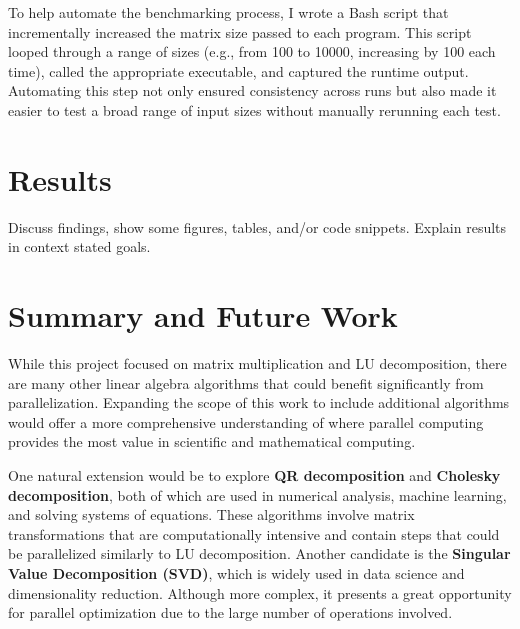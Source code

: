 \documentclass[12pt]{article}
\begin{document}
To help automate the benchmarking process, I wrote a Bash script that incrementally increased the matrix size passed to each program. This script looped
through a range of sizes (e.g., from 100 to 10000, increasing by 100 each time), called the appropriate executable, and captured the runtime output.
Automating this step not only ensured consistency across runs but also made it easier to test a broad range of input sizes without manually rerunning
each test.


\section{Results}
Discuss findings, show some figures, tables, and/or code snippets.
Explain results in context stated goals.


\section{Summary and Future Work}
While this project focused on matrix multiplication and LU decomposition, there are many other linear algebra algorithms that could benefit significantly
from parallelization. Expanding the scope of this work to include additional algorithms would offer a more comprehensive understanding of where parallel
computing provides the most value in scientific and mathematical computing.

\vspace{1em}


One natural extension would be to explore \textbf{QR decomposition} and \textbf{Cholesky decomposition}, both of which are used in numerical analysis,
machine learning, and solving systems of equations. These algorithms involve matrix transformations that are computationally intensive and contain
steps that could be parallelized similarly to LU decomposition. Another candidate is the \textbf{Singular Value Decomposition (SVD)}, which is widely
used in data science and dimensionality reduction. Although more complex, it presents a great opportunity for parallel optimization due to the large number
of operations involved.
\end{document}
